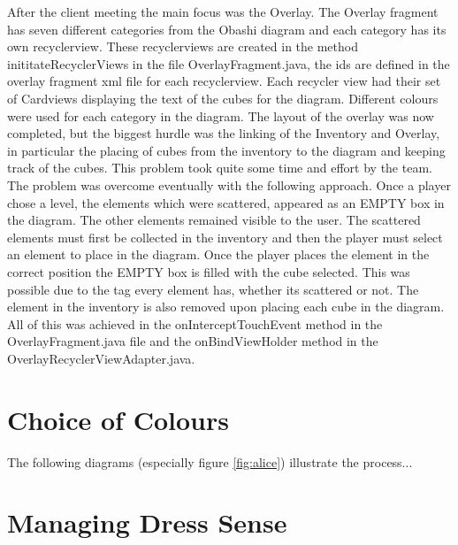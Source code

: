 \documentclass{l3proj}
\begin{document}
After the client meeting the main focus was the Overlay. The Overlay fragment has seven different 
categories from the Obashi diagram and each category has its own recyclerview\cite{Recyclerviews}. 
These recyclerviews are created in the method inititateRecyclerViews in the file OverlayFragment.java, 
the ids\cite{ID's} are defined in the overlay fragment xml file for each recyclerview. Each recycler 
view had their set of Cardviews displaying the text of the cubes for the diagram. Different colours 
were used for each category in the diagram. The layout of the overlay was now completed, but the 
biggest hurdle was the linking of the Inventory and Overlay, in particular the placing of cubes 
from the inventory to the diagram and keeping track of the cubes. This problem took quite some time 
and effort by the team. The problem was overcome eventually with the following approach. Once a 
player chose a level, the elements which were scattered, appeared as an EMPTY box in the diagram. 
The other elements remained visible to the user. The scattered elements must first be collected in 
the inventory and then the player must select an element to place in the diagram. Once the player 
places the element in the correct position the EMPTY box is filled with the cube selected. This was 
possible due to the tag\cite{Tags} every element has, whether its scattered or not. The element in 
the inventory is also removed upon placing each cube in the diagram. All of this was achieved in the 
onInterceptTouchEvent method in the OverlayFragment.java file and the onBindViewHolder method in 
the OverlayRecyclerViewAdapter.java.











\section{Choice of Colours}
\label{design}

The following diagrams (especially figure \ref{fig:alice}) illustrate the
process...

\section{Managing Dress Sense}
\label{managing}
\end{document}
